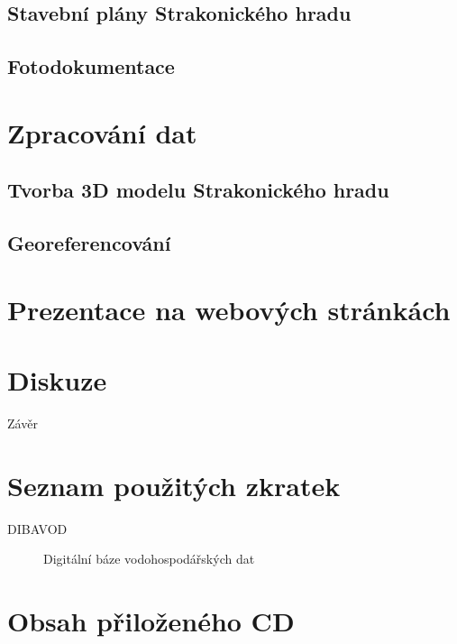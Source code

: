 \documentclass[thesis=M,czech]{FITthesis}[2012/06/26]
\begin{document}
\section{Stavební plány Strakonického hradu}


\section{Fotodokumentace}

\chapter{Zpracování dat}
\section{Tvorba 3D modelu Strakonického hradu}

\section{Georeferencování}


\chapter{Prezentace na webových stránkách}


\chapter{Diskuze}



\begin{conclusion}
Závěr
\end{conclusion}




\appendix

\chapter{Seznam použitých zkratek}
\begin{description}
	\item[DIBAVOD] Digitální báze vodohospodářských dat

\end{description}



\chapter{Obsah přiloženého CD}

\begin{figure}
\end{figure}
\end{document}
